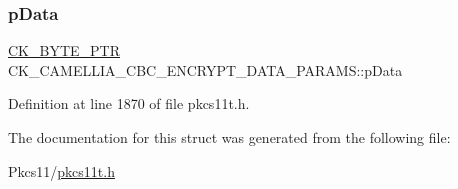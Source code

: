 \subsubsection{\texorpdfstring{p\+Data}{pData}}
{\footnotesize\ttfamily \hyperlink{pkcs11t_8h_a3d7233a4077fbaf7ae76b64da0a62a21}{C\+K\+\_\+\+B\+Y\+T\+E\+\_\+\+P\+TR} C\+K\+\_\+\+C\+A\+M\+E\+L\+L\+I\+A\+\_\+\+C\+B\+C\+\_\+\+E\+N\+C\+R\+Y\+P\+T\+\_\+\+D\+A\+T\+A\+\_\+\+P\+A\+R\+A\+M\+S\+::p\+Data}



Definition at line 1870 of file pkcs11t.\+h.



The documentation for this struct was generated from the following file\+:\begin{DoxyCompactItemize}
\item 
Pkcs11/\hyperlink{pkcs11t_8h}{pkcs11t.\+h}\end{DoxyCompactItemize}
